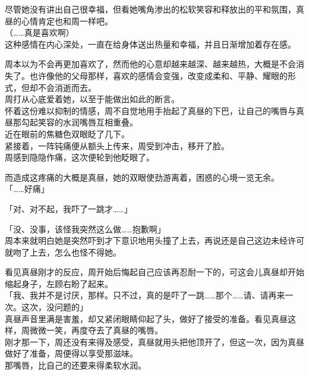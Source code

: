尽管她没有讲出自己很幸福，但看她嘴角渗出的松软笑容和释放出的平和氛围，真昼的心情肯定也和周一样吧。\\

（……真是喜欢啊）\\

这种感情在内心深处，一直在给身体送出热量和幸福，并且日渐增加着存在感。

周本以为不会再更加喜欢了，然而他的心意却越来越深、越来越热，大概是不会消失了。也许像他的父母那样，喜欢的感情会变强，改变成柔和、平静、耀眼的形式，但却不会消逝而去。\\

周打从心底爱着她，以至于能做出如此的断言。\\

怀着这份难以抑制的情感，周不自觉地用手抬起了真昼的下巴，让自己的嘴唇与真昼那勾起笑容的水润嘴唇互相重叠。\\

近在眼前的焦糖色双眼眨了几下。\\

紧接着，一阵钝痛便从额头上传来，周受到冲击，移开了脸。\\

周感到隐隐作痛，这次便轮到他眨眼了。

而造成这疼痛的大概是真昼，她的双眼使劲游离着，困惑的心境一览无余。\\

「……好痛」

「对、对不起，我吓了一跳才……」

「没、没事，该怪我突然这么做……抱歉啊」\\

周本来就明白她是突然吓到才下意识地用头撞了上去，再说还是自己这边未经许可就吻了上去，怎么也怪不得她。

看见真昼刚才的反应，周开始后悔起自己应该再忍耐一下的，可这会儿真昼却开始缩起身子，左顾右盼了起来。\\

「我、我并不是讨厌，那样。只不过，真的是吓了一跳……那个……请、请再来一次。这次，没问题的」\\

真昼声音里满是害羞，却又紧闭眼睛仰起了头，做好了接受的准备。看见真昼这样，周微微一笑，再度夺去了真昼的嘴唇。\\

刚才那一下，周还没有来得及感受，真昼就用头把他顶开了，但这一次，因为真昼做好了准备，周便得以享受那滋味。\\

那嘴唇，比自己的还要来得柔软水润。

